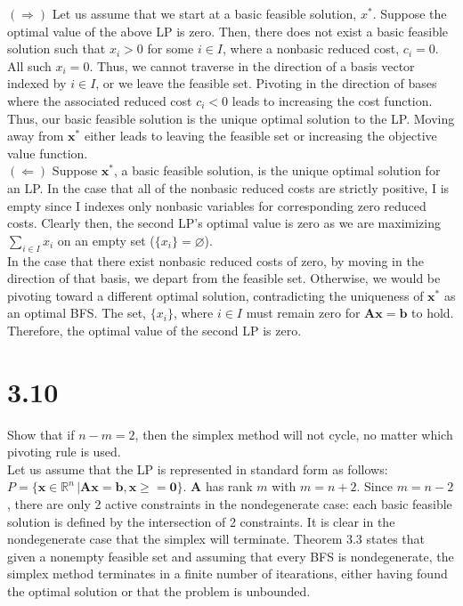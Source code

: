 \documentclass{article}
\begin{document}
\noindent $(\Rightarrow)$
Let us assume that we start at a basic feasible solution, $x^*$.  Suppose the optimal value of the above LP is zero.  Then, there does not exist a basic feasible solution such that $x_i >0$ for some $i \in I$, where a nonbasic reduced cost, $c_i = 0$.  All such $x_i = 0$.  Thus, we cannot traverse in the direction of a basis vector indexed by $i \in I$, or we leave the feasible set.  Pivoting in the direction of bases where the associated reduced cost $c_i < 0$ leads to increasing the cost function.  Thus, our basic feasible solution is the unique optimal solution to the LP.  Moving away from $\mathbf{x^*}$ either leads to leaving the feasible set or increasing the objective value function.\\

\noindent $(\Leftarrow)$
Suppose $\mathbf{x^*}$, a basic feasible solution, is the unique optimal solution for an LP.  In the case that all of the nonbasic reduced costs are strictly positive, I is empty since I indexes only nonbasic variables for corresponding zero reduced costs.  Clearly then, the second LP's optimal value is zero as we are maximizing $\sum_{i \in I} x_i$ on an empty set ($\{x_i \} = \varnothing$).  \\

\noindent
In the case that there exist nonbasic reduced costs of zero, by moving in the direction of that basis, we depart from the feasible set.  Otherwise, we would be pivoting toward a different optimal solution, contradicting the uniqueness of $\mathbf{x^*}$ as an optimal BFS.  The set, $\{x_i\}$, where $i \in I$ must remain zero for $\mathbf{Ax=b}$ to hold.  Therefore, the optimal value of the second LP is zero.  

\pagebreak
\section*{3.10}
Show that if $n - m = 2$, then the simplex method will not cycle, no matter which pivoting rule is used.\\ 

\noindent
Let us assume that the LP is represented in standard form as follows: $P = \{\mathbf{x} \in \mathbb{R}^n \, | \mathbf{Ax = b, x \geq = 0} \}$.  $\mathbf{A}$ has rank $m$ with $m = n+2$.  Since $m=n-2$, there are only 2 active constraints in the nondegenerate case:  each basic feasible solution is defined by the intersection of 2 constraints.  It is clear in the nondegenerate case that the simplex will terminate.  Theorem 3.3 states that given a nonempty feasible set and assuming that every BFS is nondegenerate, the simplex method terminates in a finite number of itearations, either having found the optimal solution or that the problem is unbounded.\\
\end{document}
